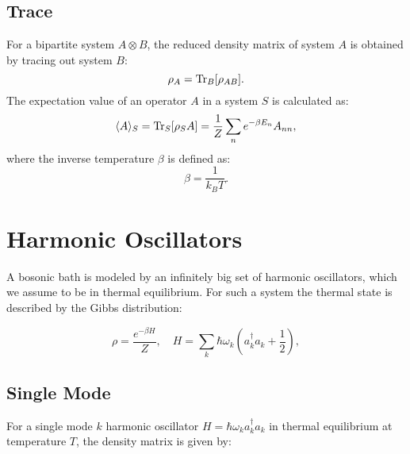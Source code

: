 
\subsection{Trace}
For a bipartite system \( A \otimes B \), the reduced density matrix of system \( A \) is obtained by tracing out system \( B \):
\begin{equation} \label{eq:partial_trace}
\rho_A = \mathrm{Tr}_B[\rho_{AB}].
\end{equation}
The expectation value of an operator \( A \) in a system \( S \) is calculated as:
\begin{equation} \label{eq:expectation_value}
\langle A \rangle_S = \mathrm{Tr}_S[\rho_S A] = \frac{1}{Z} \sum_n e^{-\beta E_n} A_{nn},
\end{equation}
where the inverse temperature \(\beta\) is defined as:
\begin{equation} \label{eq:beta_definition}
\beta = \frac{1}{k_B T}.
\end{equation}



\section{Harmonic Oscillators}
A bosonic bath is modeled by an infinitely big set of harmonic oscillators, which we assume to be in thermal equilibrium.
For such a system the thermal state is described by the Gibbs distribution:

\begin{equation} \label{eq:gibbs_state}
\rho = \frac{e^{-\beta H}}{Z}, \quad H = \sum_k \hbar \omega_k \left(a_k^{\dagger} a_k + \frac{1}{2}\right),
\end{equation}

\subsection{Single Mode}
For a single mode \( k \) harmonic oscillator \( H = \hbar \omega_k a_k^{\dagger} a_k \) in thermal equilibrium at temperature \( T \), the density matrix is given by:


